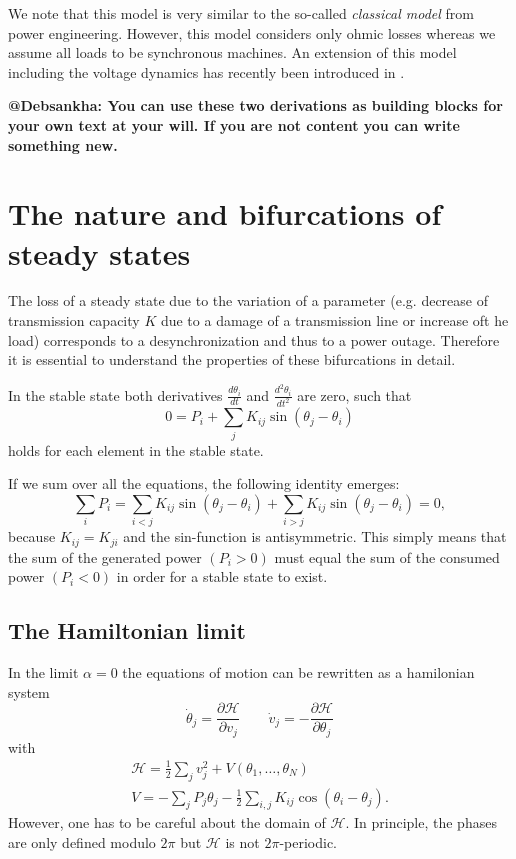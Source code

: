 \documentclass[10pt,aps,pra,twocolumn,superscriptaddress]{revtex4-1}
\newcommand{\be}{\begin{equation}}
\newcommand{\ee}{\end{equation}}
\newcommand{\bea}{\begin{eqnarray}}
\newcommand{\eea}{\end{eqnarray}}
\newcommand{\nn}{\nonumber}
\newcommand{\HH}{\mathcal{H}}
\begin{document}
We note that this model is very similar to the so-called \emph{classical
model} from power engineering. However, this model considers only 
ohmic losses whereas we assume all loads to be synchronous machines.
An extension of this model including the voltage dynamics has recently 
been introduced in \cite{Schm13}. 


\textbf{@Debsankha: You can use these two derivations as building blocks for your own text at your will. 
If you are not content you can write something new.}

\section{The nature and bifurcations of steady states}
The loss of a steady state due to the variation of a parameter (e.g. decrease of transmission capacity $K$ due to a damage of a transmission line or increase oft he load) corresponds to a desynchronization and thus to a power outage. Therefore it is essential to understand the properties of these bifurcations in detail.

In the stable state both derivatives $\frac{d\theta_i}{dt}$ and $\frac{d^2\theta_i}{dt^2}$ are zero, such that
\begin{equation}
\label{eq-criter-steady-state}
 0=P_i + \sum_j K_{ij}\sin(\theta_j-\theta_i)
\end{equation}
holds for each element in the stable state.

If we sum over all the equations, the following identity emerges:
\begin{equation}
 \sum_i P_i=\sum_{i<j}K_{ij}\sin(\theta_j-\theta_i)+\sum_{i>j}K_{ij}\sin(\theta_j-\theta_i)=0, \label{eqn:sum}
\end{equation}
because $K_{ij}=K_{ji}$ and the sin-function is antisymmetric. This simply 
means that the sum of the generated power $(P_i>0)$ must equal the sum of 
the consumed power $(P_i<0)$ in order for a 
stable state to exist.  


\subsection{The Hamiltonian limit}
In the limit $\alpha=0$ the equations of motion can be rewritten as a hamilonian system
\be
   \dot \theta_j = \frac{\partial \HH}{\partial v_j} \qquad
   \dot v_j = -\frac{\partial \HH}{\partial \theta_j}
\ee 
with
\bea
   \HH = \frac{1}{2} \sum_j  v_j^2 + V(\theta_1,\ldots,\theta_N) \nn \\
  V = - \sum_j P_j \theta_j - \frac{1}{2} \sum_{i,j} K_{ij} \cos(\theta_i - \theta_j).
\eea
However, one has to be careful about the domain of $\HH$. In principle, the phases are only defined
modulo $2\pi$ but $\HH$ is not $2\pi$-periodic.
\end{document}
